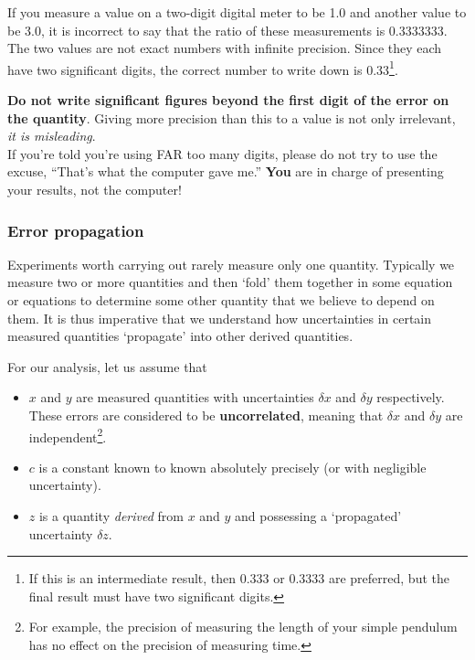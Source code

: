 If you measure a value on a two-digit digital meter to be 1.0 and another value to be 3.0, it is incorrect to say that the ratio of these measurements is 0.3333333. The two values are not exact numbers with infinite precision. Since they each have two significant digits, the correct number to write down is 0.33\footnote{If this is an intermediate result, then 0.333 or 0.3333 are preferred, but the final result must have two significant digits.}.

\begin{imp}
\textbf{Do not write significant figures beyond the first digit of the error on the quantity}. Giving more precision than this to a value is not only irrelevant, \textit{it is misleading}.\\

If you're told you're using FAR too many digits, please do not try to use the excuse, ``That's what the computer gave me.'' \textbf{You} are in charge of presenting your results, not the computer!
\end{imp}


\subsubsection{Error propagation}

Experiments worth carrying out rarely measure only one quantity. Typically we measure two or more quantities and then `fold' them together in some equation or equations to determine some other quantity that we believe to depend on them. It is thus imperative that we understand how uncertainties in certain measured quantities `propagate' into other derived quantities.

For our analysis, let us assume that

\begin{itemize}
    \item $x$ and $y$ are measured quantities with uncertainties $\delta x$ and $\delta y$ respectively. These errors are considered to be \textbf{uncorrelated}, meaning that $\delta x$ and $\delta y$ are independent\footnote{For example, the precision of measuring the length of your simple pendulum has no effect on the precision of measuring time.}.
    
    \item $c$ is a constant known to known absolutely precisely (or with negligible uncertainty).
    
    \item $z$ is a quantity \textit{derived} from $x$ and $y$ and possessing a `propagated' uncertainty $\delta z$.
\end{itemize}

